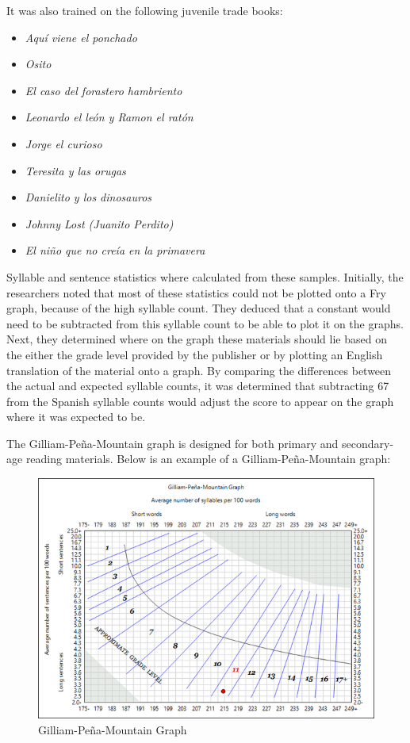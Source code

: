 \documentclass[
]{book}
\providecommand{\tightlist}{%
  \setlength{\itemsep}{0pt}\setlength{\parskip}{0pt}}
\theoremstyle{definition}
\theoremstyle{definition}
\theoremstyle{definition}
\theoremstyle{definition}
\theoremstyle{remark}
\begin{document}
It was also trained on the following juvenile trade books:

\begin{itemize}
\tightlist
\item
  \emph{Aquí viene el ponchado}
\item
  \emph{Osito}
\item
  \emph{El caso del forastero hambriento}
\item
  \emph{Leonardo el león y Ramon el ratón}
\item
  \emph{Jorge el curioso}
\item
  \emph{Teresita y las orugas}
\item
  \emph{Danielito y los dinosauros}
\item
  \emph{Johnny Lost (Juanito Perdito)}
\item
  \emph{El niño que no creía en la primavera}
\end{itemize}

Syllable and sentence statistics where calculated from these samples. Initially, the researchers noted that most of these statistics could not be plotted onto a Fry graph, because of the high syllable count. They deduced that a constant would need to be subtracted from this syllable count to be able to plot it on the graphs. Next, they determined where on the graph these materials should lie based on the either the grade level provided by the publisher or by plotting an English translation of the material onto a graph. By comparing the differences between the actual and expected syllable counts, it was determined that subtracting 67 from the Spanish syllable counts would adjust the score to appear on the graph where it was expected to be.

The Gilliam-Peña-Mountain graph is designed for both primary and secondary-age reading materials. Below is an example of a Gilliam-Peña-Mountain graph:

\begin{figure}[H]

{\centering \includegraphics[width=0.75\linewidth,]{Images/GpmFry} 

}

\caption{Gilliam-Peña-Mountain Graph}\label{fig:gpm}
\end{figure}
\end{document}

